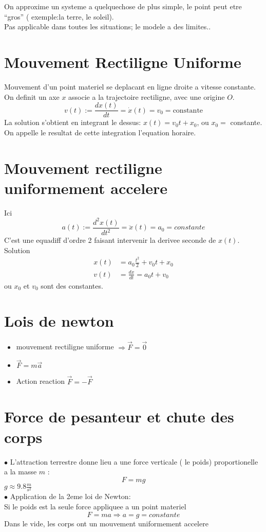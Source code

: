 \documentclass[../main.tex]{subfiles}
\begin{document}
On approxime un systeme a quelquechose de plus simple, le point peut etre ``gros'' ( exemple:la terre, le soleil).\\
Pas applicable dans toutes les situations; le modele a des limites..
\section{Mouvement Rectiligne Uniforme}
Mouvement d'un point materiel se deplacant en ligne droite a vitesse constante.\\
On definit un axe $x$ associe a la trajectoire rectiligne, avec une origine $O$.
\[ 
	v(t) := \frac{dx(t)}{dt} = \dot{x}(t) = v_0= \text{constante}
\]
La solution s'obtient en integrant le dessus: $x(t) = v_0 t + x_0$, ou $ x_0=$ constante.\\
On appelle le resultat de cette integration l'equation horaire.\\
\section{Mouvement rectiligne uniformement accelere}
Ici
\[ 
	a(t) := \frac{d^{2}x(t)}{dt^{2}	} = \ddot{x} ( t) = a_0 = constante	
\]
C'est une equadiff d'ordre 2 faisant intervenir la derivee seconde de $x(t)$.\\
Solution
\begin{align*}
	x(t) &= a_0 \frac{t^{2}}{2} + v_0 t + x_0\\
	v(t) &= \frac{dx}{dt} = a_0 t + v_0
\end{align*}
ou $ x_0$ et $ v_0$ sont des constantes.\\

\section{Lois de newton}
\begin{itemize}
	\item mouvement rectiligne uniforme $\Rightarrow \vec{F} = \vec{0}$ \\
	\item $\vec{F} = m \vec{a}$ \\
	\item Action reaction $\vec{F} = -\vec{F}$
\end{itemize}
\section{Force de pesanteur et chute des corps}
$\bullet$ L'attraction terrestre donne lieu a une force verticale ( le poids)  proportionelle a la masse $m$ :
\[ 
F= mg
\]
$g \approx 9.8 \frac{m}{s^{2}}$\\
$\bullet$ Application de la 2eme loi de Newton:\\
Si le poids est la seule force appliquee a un point materiel
\[ 
F = ma \Rightarrow a = g = constante
\]
Dans le vide, les corps ont un mouvement uniformement accelere



	

	
\end{document}
